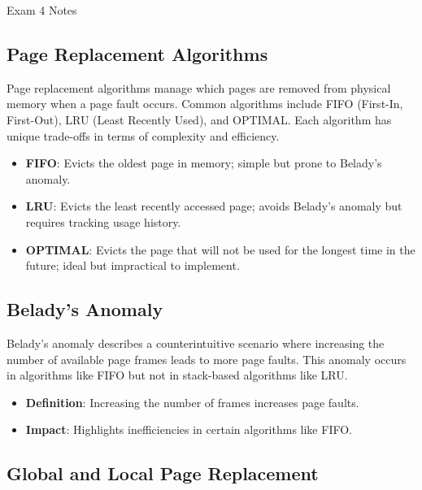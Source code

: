\begin{examnotes}{Exam 4 Notes}
    \subsection*{Page Replacement Algorithms}
    
    Page replacement algorithms manage which pages are removed from physical memory when a page fault occurs. Common algorithms include FIFO (First-In, First-Out), LRU (Least Recently Used), and OPTIMAL. 
    Each algorithm has unique trade-offs in terms of complexity and efficiency.
    
    \begin{highlight}
        \begin{itemize}
            \item \textbf{FIFO}: Evicts the oldest page in memory; simple but prone to Belady's anomaly.
            \item \textbf{LRU}: Evicts the least recently accessed page; avoids Belady's anomaly but requires tracking usage history.
            \item \textbf{OPTIMAL}: Evicts the page that will not be used for the longest time in the future; ideal but impractical to implement.
        \end{itemize}
    \end{highlight}
    
    \subsection*{Belady's Anomaly}
    
    Belady's anomaly describes a counterintuitive scenario where increasing the number of available page frames leads to more page faults. This anomaly occurs in algorithms like FIFO but not in stack-based 
    algorithms like LRU.
    
    \begin{highlight}
        \begin{itemize}
            \item \textbf{Definition}: Increasing the number of frames increases page faults.
            \item \textbf{Impact}: Highlights inefficiencies in certain algorithms like FIFO.
        \end{itemize}
    \end{highlight}
    
    \subsection*{Global and Local Page Replacement}
    

\end{examnotes}
